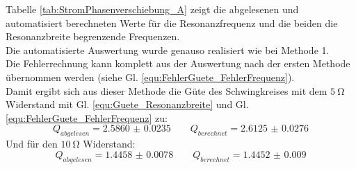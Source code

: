 \documentclass[12pt,a4paper]{article}
\begin{document}
Tabelle \ref{tab:StromPhasenverschiebung_A} zeigt die abgelesenen und automatisiert berechneten Werte für die Resonanzfrequenz und die beiden die Resonanzbreite begrenzende Frequenzen. \\
Die automatisierte Auswertung wurde genauso realisiert wie bei Methode 1. \\
Die Fehlerrechnung kann komplett aus der Auswertung nach der ersten Methode übernommen werden (siehe Gl. \ref{equ:FehlerGuete_FehlerFrequenz}). \\
Damit ergibt sich aus dieser Methode die Güte des Schwingkreises mit dem $\SI{5}{\ohm}$ Widerstand mit Gl. \ref{equ:Guete_Resonanzbreite} und Gl. \ref{equ:FehlerGuete_FehlerFrequenz} zu:
\begin{equation*}
Q_{abgelesen} = \num{2.5860(235)} \qquad Q_{berechnet} = \num{2.6125(276)}
\end{equation*}
Und für den $\SI{10}{\ohm}$ Widerstand:
\begin{equation*}
Q_{abgelesen} = \num{1.4458(78)} \qquad Q_{berechnet} = \num{1.4452(90)}
\end{equation*}
\end{document}
